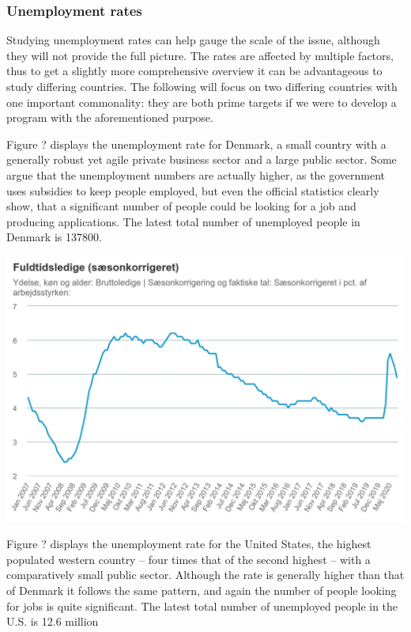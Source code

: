 \subsubsection{Unemployment rates}

Studying unemployment rates can help gauge the scale of the issue, although they
will not provide the full picture. The rates are affected by multiple factors,
thus to get a slightly more comprehensive overview it can be advantageous to
study differing countries. The following will focus on two differing countries
with one important commonality: they are both prime targets if we were to
develop a program with the aforementioned purpose.

Figure ? displays the unemployment rate for Denmark, a small country with a
generally robust yet agile private business sector and a large public sector.
Some argue that the unemployment numbers are actually higher, as the government
uses subsidies to keep people employed, but even the official statistics clearly
show, that a significant number of people could be looking for a job and
producing applications.\cite{cepos} The latest total number of unemployed people
in Denmark is 137800.

\includegraphics{figures/DK_unemployment_rate}%

Figure ? displays the unemployment rate for the United States, the highest
populated western country -- four times that of the second highest -- with a
comparatively small public sector. Although the rate is generally higher than
that of Denmark it follows the same pattern, and again the number of people
looking for jobs is quite significant. The latest total number of unemployed
people in the U.S. is 12.6 million

